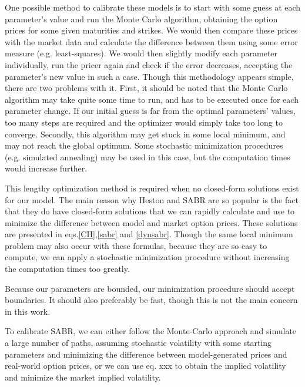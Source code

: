 One possible method to calibrate these models is to start with some guess at each parameter's value and run the Monte Carlo algorithm, obtaining the option prices for some given maturities and strikes. We would then compare these prices with the market data and calculate the difference between them using some error measure (e.g. least-squares). We would then slightly modify each parameter individually, run the pricer again and check if the error decreases, accepting the parameter's new value in such a case.
Though this methodology appears simple, there are two problems with it. First, it should be noted that the Monte Carlo algorithm may take quite some time to run, and has to be executed once for each parameter change. If our initial guess is far from the optimal parameters' values, too many steps are required and the optimizer would simply take too long to converge. Secondly, this algorithm may get stuck in some local minimum, and may not reach the global optimum. Some stochastic minimization procedures (e.g. simulated annealing) may be used in this case, but the computation times would increase further.

This lengthy optimization method is required when no closed-form solutions exist for our model. The main reason why Heston and SABR are so popular is the fact that they do have closed-form solutions that we can rapidly calculate and use to minimize the difference between model and market option prices. These solutions are presented in eqs.\eqref{CH},\eqref{sabr} and \eqref{dynsabr}.
Though the same local minimum problem may also occur with these formulas, because they are so easy to compute, we can apply a stochastic minimization procedure without increasing the computation times too greatly.

Because our parameters are bounded, our minimization procedure should accept boundaries. It should also preferably be fast, though this is not the main concern in this work.



To calibrate SABR, we can either follow the Monte-Carlo approach and simulate a large number of paths, assuming stochastic volatility with some starting parameters and minimizing the difference between model-generated prices and real-world option prices, or we can use eq. xxx to obtain the implied volatility and minimize the market implied volatility.
